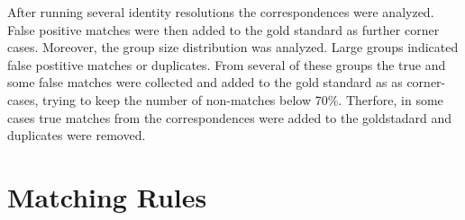 \documentclass[11pt,titlepage,oneside,openany]{book}
\begin{document}
After running several identity resolutions the correspondences were analyzed. False positive matches were then added to the gold standard as further corner cases. Moreover, the group size distribution was analyzed. Large groups indicated false postitive matches or duplicates. From several of these groups the true and some false matches were collected and added to the gold standard as as corner-cases, trying to keep the number of non-matches below 70\%. Therfore, in some cases true matches from the correspondences were added to the goldstadard and duplicates were removed.

\section{Matching Rules}
\label{sec:matching-rules}
\end{document}
